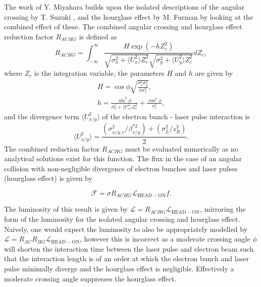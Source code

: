 \documentclass[../main.tex]{subfiles}
\begin{document}
The work of Y. Miyahara \cite{miyahara2008luminosity} builds upon the isolated descriptions of the angular crossing by T. Suzuki \cite{suzuki1976general}, and the hourglass effect by M. Furman \cite{furman1991hourglas} by looking at the combined effect of these. The combined angular crossing and hourglass effect reduction factor $R_{ACHG}$ is defined as
\begin{equation}
R_{ACHG} = \int_{-\infty}^{\infty}\frac{H\exp\left(-hZ_{c}^{2}\right)}{\sqrt{\sigma_{x}^{2}+\langle U_{x}^2\rangle Z_{c}^{2}}\sqrt{\sigma_{y}^{2}+\langle U_{y}^{2}\rangle Z_{c}^{2}}}dZ_{c},
\label{eq:miyahara_combined_reduction}    
\end{equation}
where $Z_{c}$ is the integration variable, the parameters $H$ and $h$ are given by
\begin{gather}
H = \cos\phi\sqrt{\frac{\sigma_{x}^{2}\sigma_{y}^{2}}{\pi\sigma_{z}^{2}}},
\label{eq:miyahara_H_parameter} \\
h = \frac{\sin^{2}\phi}{\sigma_{x}^{2}+\langle U_{x}^{2}\rangle Z_{c}^{2}}+\frac{\cos^{2}\phi}{\sigma_{z}^{2}},
\label{eq:miyahara_h_parameter}
\end{gather}
and the divergence term $\langle U_{x/y}^{2}\rangle$ of the electron bunch - laser pulse interaction is
\begin{equation}
\langle U_{x/y}^{2}\rangle = \frac{\left(\sigma_{x/y,e}^{2}/\beta_{x/y}^{*2}\right)+\left(\sigma_{L}^{2}/z_{R}^{2}\right)}{2}.    
\end{equation}
The combined reduction factor $R_{ACHG}$ must be evaluated numerically as no analytical solutions exist for this function. The flux in the case of an angular collision with non-negligible divergence of electron bunches and laser pulses (hourglass effect) is given by

\begin{equation}
\mathcal{F} = \sigma R_{ACHG}\mathcal{L}_{\mathrm{HEAD-ON}}f.
\label{eq:flux_angular_crossing_hourglass}
\end{equation}

The luminosity of this result is given by $\mathcal{L} = R_{ACHG}\mathcal{L}_{\mathrm{HEAD-ON}}$, mirroring the form of the luminosity for the isolated angular crossing and hourglass effect. Naively, one would expect the luminosity to also be appropriately modelled by $\mathcal{L} = R_{AC}R_{HG}\mathcal{L}_{\mathrm{HEAD-ON}}$, however this is incorrect as a moderate crossing angle $\phi$ will shorten the interaction time between the laser pulse and electron beam such that the interaction length is of an order at which the electron bunch and laser pulse minimally diverge and the hourglass effect is negligible. Effectively a moderate crossing angle suppresses the hourglass effect.   
\end{document}
